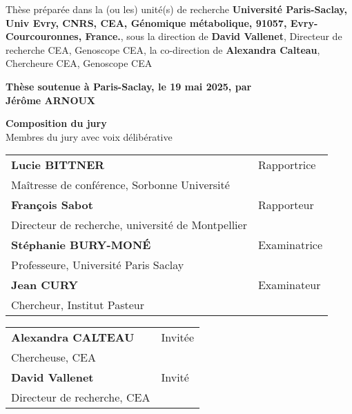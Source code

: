\begin{titlepage}
\footnotesize Thèse préparée dans la (ou les) unité(s) de recherche \textbf{Université Paris-Saclay, Univ Evry, CNRS, CEA, Génomique métabolique, 91057, Evry-Courcouronnes, France.}, sous la direction de \textbf{David Vallenet}, Directeur de recherche CEA, Genoscope CEA, la co-direction de \textbf{Alexandra Calteau}, Chercheure CEA, Genoscope CEA\\
\vspace{15mm}

\textbf{Thèse soutenue à Paris-Saclay, le 19 mai 2025, par}\\
\bigskip
\Large {\color{Prune} \textbf{Jérôme ARNOUX}} %

\vspace{\fill} %

\bigskip

\flushleft
\small {\color{Prune} \textbf{Composition du jury}}\\
{\color{Prune} \scriptsize {Membres du jury avec voix délibérative}} \\
\vspace{2mm}
\scriptsize
\begin{tabular}{|p{7cm}l}
\arrayrulecolor{Prune}
\textbf{Lucie BITTNER} &  Rapportrice \\ 
Maîtresse de conférence, Sorbonne Université   &   \\ 
\textbf{François Sabot} &  Rapporteur \\ 
Directeur de recherche, université de Montpellier  &   \\ 
\textbf{Stéphanie BURY-MONÉ} & Examinatrice\\ 
Professeure, Université Paris Saclay & \\
\textbf{Jean CURY} &  Examinateur \\ 
Chercheur, Institut Pasteur   &   \\
\end{tabular} 
\vspace{2mm}

\begin{tabular}{p{7cm}l}
\textbf{Alexandra CALTEAU} & Invitée\\ 
Chercheuse, CEA & \\
\textbf{David Vallenet} & Invité\\ 
Directeur de recherche, CEA & \\
\end{tabular} 

\end{titlepage}